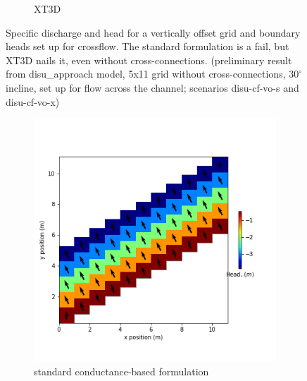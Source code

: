 \documentclass{article}
\begin{document}
\begin{figure}[H]
\begin{subfigure}{0.4\textwidth}
	\caption{XT3D}
	\label{fig:disu-x-nocc-cf-head}
\end{subfigure}
\caption{Specific discharge and head for a vertically offset grid and boundary heads set up for crossflow. The standard formulation is a fail, but XT3D nails it, even without cross-connections. (preliminary result from disu\_approach model, 5x11 grid without cross-connections, $30^{\circ}$ incline, set up for flow across the channel; scenarios disu-cf-vo-s and disu-cf-vo-x)}
\label{fig:figures}
\end{figure}

\begin{figure}[H]
\centering
\begin{subfigure}{0.4\textwidth}
	\includegraphics[width=\textwidth]{../figures/disu-cf-vs-s-head.png}
	\caption{standard conductance-based formulation}
	\label{fig:disu-s-cc-cf-head}
\end{subfigure}
\hfill
\begin{subfigure}{0.4\textwidth}

\end{subfigure}
\end{figure}
\end{document}
